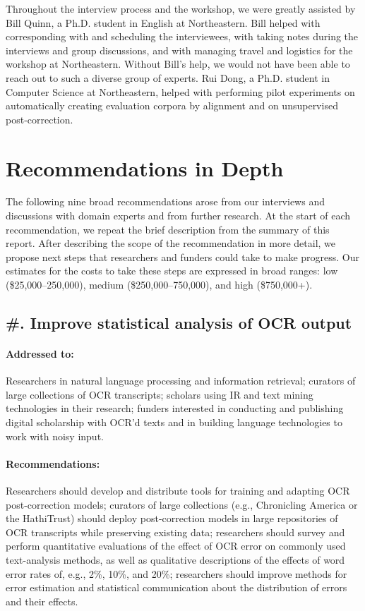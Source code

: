 \documentclass[twoside,11pt]{report}
\newcounter{reccounter}
\renewcommand{\thereccounter}{\arabic{reccounter}}
\newcommand{\recommend}[2]{\refstepcounter{reccounter}%
  \label{rec:#1}%
  \subsection{\#\thereccounter. #2}%
  \label{sec:rec-#1}}
\begin{document}
Throughout the interview process and the workshop, we were greatly assisted by Bill Quinn, a Ph.D. student in English at Northeastern. Bill helped with corresponding with and scheduling the interviewees, with taking notes during the interviews and group discussions, and with managing travel and logistics for the workshop at Northeastern. Without Bill's help, we would not have been able to reach out to such a diverse group of experts. Rui Dong, a Ph.D. student in Computer Science at Northeastern, helped with performing pilot experiments on automatically creating evaluation corpora by alignment and on unsupervised post-correction.

\newpage

\section{Recommendations in Depth}

The following nine broad recommendations arose from our interviews and discussions with domain experts and from further research. At the start of each recommendation, we repeat the brief description from the summary of this report. After describing the scope of the recommendation in more detail, we propose next steps that researchers and funders could take to make progress. Our estimates for the costs to take these steps are expressed in broad ranges: low (\$25,000--250,000), medium (\$250,000--750,000), and high (\$750,000+).

\recommend{stats}{Improve statistical analysis of OCR output}

\paragraph{Addressed to:} Researchers in natural language processing and information retrieval; curators of large collections of OCR transcripts; scholars using IR and text mining technologies in their research; funders interested in conducting and publishing digital scholarship with OCR'd texts and in building language technologies to work with noisy input.

\paragraph{Recommendations:} Researchers should develop and distribute tools for training and adapting OCR post-correction models; curators of large collections (e.g., Chronicling America or the HathiTrust) should deploy post-correction models in large repositories of OCR transcripts while preserving existing data; researchers should survey and perform quantitative evaluations of the effect of OCR error on commonly used text-analysis methods, as well as qualitative descriptions of the effects of word error rates of, e.g., 2\%, 10\%, and 20\%; researchers should improve methods for error estimation and statistical communication about the distribution of errors and their effects.
\end{document}
